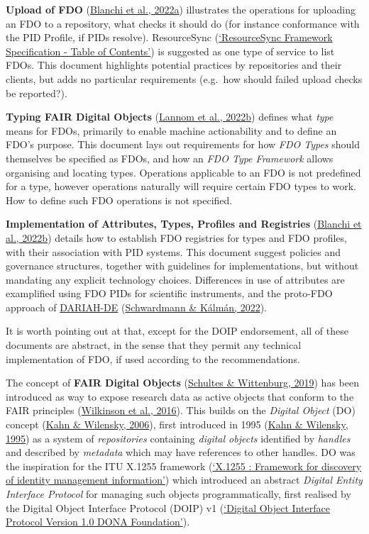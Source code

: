 \textbf{Upload of FDO} (\protect\hyperlink{ref-1H7cmmr69}{Blanchi et al., 2022a}) illustrates the operations for uploading an FDO to a repository, what checks it should do (for instance conformance with the PID Profile, if PIDs resolve). ResourceSync (\protect\hyperlink{ref-eS5y9TRh}{{`ResourceSync Framework Specification - Table of Contents'}}) is suggested as one type of service to list FDOs. This document highlights potential practices by repositories and their clients, but adds no particular requirements (e.g.~how should failed upload checks be reported?).

\textbf{Typing FAIR Digital Objects} (\protect\hyperlink{ref-ZFzPxCNB}{Lannom et al., 2022b}) defines what \emph{type} means for FDOs, primarily to enable machine actionability and to define an FDO's purpose. This document lays out requirements for how \emph{FDO Types} should themselves be specified as FDOs, and how an \emph{FDO Type Framework} allows organising and locating types. Operations applicable to an FDO is not predefined for a type, however operations naturally will require certain FDO types to work. How to define such FDO operations is not specified.

\textbf{Implementation of Attributes, Types, Profiles and Registries} (\protect\hyperlink{ref-126uxr5pI}{Blanchi et al., 2022b}) details how to establish FDO registries for types and FDO profiles, with their association with PID systems. This document suggest policies and governance structures, together with guidelines for implementations, but without mandating any explicit technology choices. Differences in use of attributes are examplified using FDO PIDs for scientific instruments, and the proto-FDO approach of \href{https://de.dariah.eu/}{DARIAH-DE} (\protect\hyperlink{ref-1CqIZ47pu}{Schwardmann \& Kálmán, 2022}).

It is worth pointing out at that, except for the DOIP endorsement, all of these documents are abstract, in the sense that they permit any technical implementation of FDO, if used according to the recommendations.

The concept of \textbf{FAIR Digital Objects} (\protect\hyperlink{ref-IHLT6hye}{Schultes \& Wittenburg, 2019}) has been introduced as way to expose research data as active objects that conform to the FAIR principles (\protect\hyperlink{ref-6DjakjNS}{Wilkinson et al., 2016}). This builds on the \emph{Digital Object} (DO) concept (\protect\hyperlink{ref-11MnuwJ4l}{Kahn \& Wilensky, 2006}), first introduced in 1995 (\protect\hyperlink{ref-3Uqe3fuK}{Kahn \& Wilensky, 1995}) as a system of \emph{repositories} containing \emph{digital objects} identified by \emph{handles} and described by \emph{metadata} which may have references to other handles. DO was the inspiration for the ITU X.1255 framework (\protect\hyperlink{ref-103Hw8H43}{{`X.1255 : Framework for discovery of identity management information'}}) which introduced an abstract \emph{Digital Entity Interface Protocol} for managing such objects programmatically, first realised by the Digital Object Interface Protocol (DOIP) v1 (\protect\hyperlink{ref-16uB3jxpa}{{`Digital Object Interface Protocol Version 1.0 \textbar{} DONA Foundation'}}).

